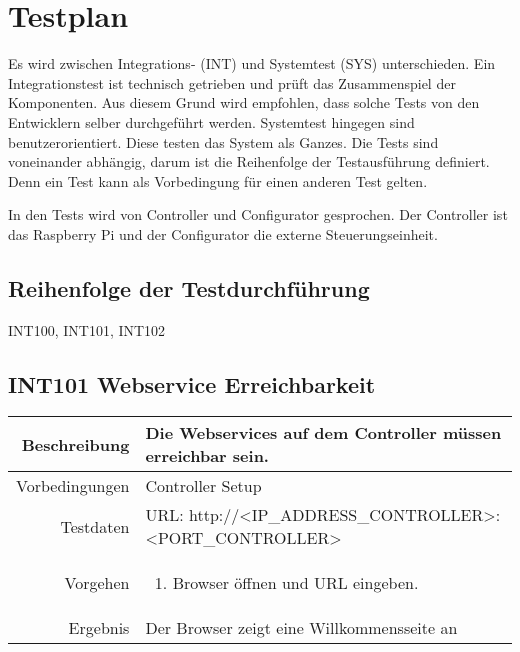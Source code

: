 \section{Testplan}
Es wird zwischen Integrations- (INT) und Systemtest (SYS) unterschieden. Ein Integrationstest
ist technisch getrieben und prüft das Zusammenspiel der Komponenten. Aus diesem
Grund wird empfohlen, dass solche Tests von den Entwicklern selber durchgeführt werden.
Systemtest hingegen sind benutzerorientiert. Diese testen das System als Ganzes.
Die Tests sind voneinander abhängig, darum ist die Reihenfolge der Testausführung
definiert. Denn ein Test kann als Vorbedingung für einen anderen Test gelten. 

In den Tests wird von Controller und Configurator gesprochen. Der Controller ist
das Raspberry Pi und der Configurator die externe Steuerungseinheit.

\subsection{Reihenfolge der Testdurchführung}
INT100, INT101, INT102

\subsection{INT101 Webservice Erreichbarkeit}
\begin{table}[h!]
	\renewcommand{\arraystretch}{1.5}
	\begin{tabular}{|r|p{14cm}|}
		\hline Beschreibung & Die Webservices auf dem Controller müssen erreichbar sein. \\ 
		\hline Vorbedingungen & Controller Setup \\ 
		\hline Testdaten & URL: http://<IP_ADDRESS_CONTROLLER>:<PORT_CONTROLLER> \\ 
		\hline Vorgehen & 
		\begin{enumerate}
			\item Browser öffnen und URL eingeben.
		\end{enumerate} \\ 
		\hline Ergebnis & Der Browser zeigt eine Willkommensseite an \\ 
		\hline 
	\end{tabular}
\end{table}

